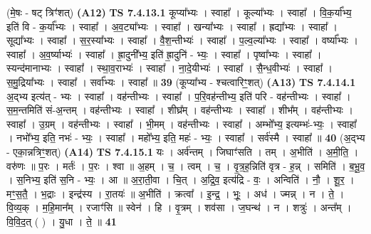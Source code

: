 \documentclass[17pt]{extarticle}
\begin{document}
                  \newline
                      (मे॒षः - षट् त्रिꣳ॑शत्)  \textbf{(A12)} \newline \newline
                                \textbf{ TS 7.4.13.1} \newline
                  कूप्या᳚भ्यः । स्वाहा᳚ । कूल्या᳚भ्यः । स्वाहा᳚ । वि॒क॒र्या᳚भ्य॒ इति॑ वि - क॒र्या᳚भ्यः । स्वाहा᳚ । अ॒व॒ट्या᳚भ्यः । स्वाहा᳚ । खन्या᳚भ्यः । स्वाहा᳚ । ह्रद्या᳚भ्यः । स्वाहा᳚ । सूद्या᳚भ्यः । स्वाहा᳚ । स॒र॒स्या᳚भ्यः । स्वाहा᳚ । वै॒श॒न्तीभ्यः॑ । स्वाहा᳚ । प॒ल्व॒ल्या᳚भ्यः । स्वाहा᳚ । वर्ष्या᳚भ्यः । स्वाहा᳚ । अ॒व॒र्ष्याभ्यः॑ । स्वाहा᳚ । ह्रा॒दुनी᳚भ्य॒ इति॑ ह्रा॒दुनि॑ - भ्यः॒ । स्वाहा᳚ । पृष्वा᳚भ्यः । स्वाहा᳚ । स्यन्द॑मानाभ्यः । स्वाहा᳚ । स्था॒व॒राभ्यः॑ । स्वाहा᳚ । ना॒दे॒यीभ्यः॑ । स्वाहा᳚ । सै॒न्ध॒वीभ्यः॑ । स्वाहा᳚ । स॒मु॒द्रिया᳚भ्यः । स्वाहा᳚ । सर्वा᳚भ्यः । स्वाहा᳚ ॥ \textbf{  39} \newline
                  \newline
                      (कूप्या᳚भ्य - श्चत्वारिꣳ॒॒शत्)  \textbf{(A13)} \newline \newline
                                \textbf{ TS 7.4.14.1} \newline
                  अ॒द्भ्य इत्य॑त् - भ्यः । स्वाहा᳚ । वह॑न्तीभ्यः । स्वाहा᳚ । प॒रि॒वह॑न्तीभ्य॒ इति॑ परि - वह॑न्तीभ्यः । स्वाहा᳚ । स॒म॒न्तमिति॑ सं-अ॒न्तम् । वह॑न्तीभ्यः । स्वाहा᳚ । शीघ्र᳚म् । वह॑न्तीभ्यः । स्वाहा᳚ । शीभ᳚म् । वह॑न्तीभ्यः । स्वाहा᳚ । उ॒ग्रम् । वह॑न्तीभ्यः । स्वाहा᳚ । भी॒मम् । वह॑न्तीभ्यः । स्वाहा᳚ । अम्भो᳚भ्य॒ इत्यम्भः॑-भ्यः॒ । स्वाहा᳚ । नभो᳚भ्य॒ इति॒ नभः॑ - भ्यः॒ । स्वाहा᳚ । महो᳚भ्य॒ इति॒ महः॑ - भ्यः॒ । स्वाहा᳚ । सर्व॑स्मै । स्वाहा᳚ ॥ \textbf{  40} \newline
                  \newline
                      (अ॒द्भ्य - एका॒न्नत्रिꣳ॒॒शत्)  \textbf{(A14)} \newline \newline
                                \textbf{ TS 7.4.15.1} \newline
                  यः । अर्व॑न्तम् । जिघाꣳ॑सति । तम् । अ॒भीति॑ । अ॒मी॒ति॒ । वरु॑णः ॥ प॒रः । मर्तः॑ । प॒रः । श्वा ॥ अ॒हम् । च॒ । त्वम् । च॒ । वृ॒त्र॒ह॒न्निति॑ वृत्र - ह॒न्न् । समिति॑ । ब॒भू॒व॒ । स॒निभ्य॒ इति॑ स॒नि - भ्यः॒ । आ ॥ अ॒रा॒ती॒वा । चि॒त् । अ॒द्रि॒व॒ इत्य॑द्रि - वः॒ । अन्विति॑ । नौ॒ । शू॒र॒ । मꣳ॒॒स॒तै॒ । भ॒द्राः । इन्द्र॑स्य । रा॒तयः॑ ॥ अ॒भीति॑ । क्रत्वा᳚ । इ॒न्द्र॒ । भूः॒ । अध॑ । ज्मन्न् । न । ते॒ । वि॒व्य॒क् । म॒हि॒मान᳚म् । रजाꣳ॑सि ॥ स्वेन॑ । हि । वृ॒त्रम् । शव॑सा । ज॒घन्थ॑ । न । शत्रुः॑ । अन्त᳚म् । वि॒वि॒द॒त् ( ) । यु॒धा । ते॒ ॥ \textbf{  41} \newline
\end{document}
